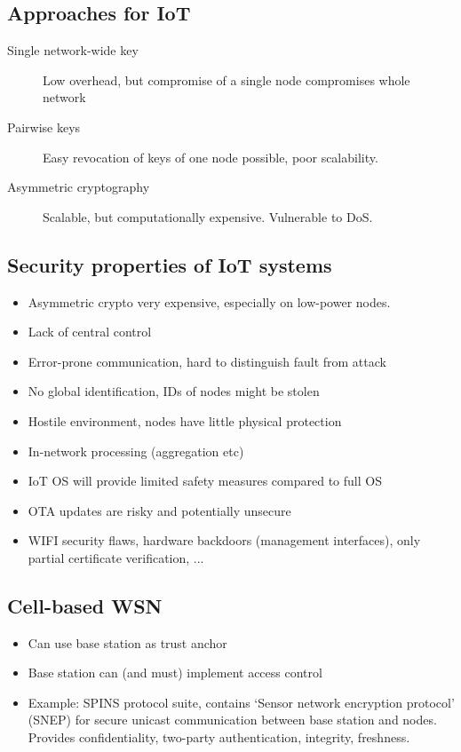 \subsection{Approaches for IoT}

\begin{description}
		\item[Single network-wide key] Low overhead, but compromise of a single
				node compromises whole network
		\item[Pairwise keys] Easy revocation of keys of one node possible, poor scalability.
		\item[Asymmetric cryptography] Scalable, but computationally expensive.
				Vulnerable to DoS.
\end{description}

\subsection{Security properties of IoT systems}

\begin{itemize}
		\item Asymmetric crypto very expensive, especially on low-power nodes.
		\item Lack of central control
		\item Error-prone communication, hard to distinguish fault from attack
		\item No global identification, IDs of nodes might be stolen
		\item Hostile environment, nodes have little physical protection
		\item In-network processing (aggregation etc)
		\item IoT OS will provide limited safety measures compared to full OS
		\item OTA updates are risky and potentially unsecure
		\item WIFI security flaws, hardware backdoors (management interfaces),
				only partial certificate verification, ...
\end{itemize}

\subsection{Cell-based WSN}

\begin{itemize}
		\item Can use base station as trust anchor
		\item Base station can (and must) implement access control
		\item Example: SPINS protocol suite, contains `Sensor network
				encryption protocol' (SNEP) for secure unicast communication
				between base station and nodes. Provides confidentiality,
				two-party authentication, integrity, freshness.
\end{itemize}

